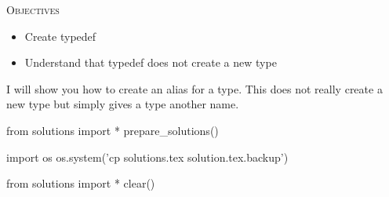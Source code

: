 
\textsc{Objectives}
\begin{itemize}
\item Create typedef
\item Understand that typedef does not create a new type
\end{itemize}

I will show you how to create an alias for a type. This does not really
create a new type but simply gives a type another name.





\begin{python0}
from solutions import *
prepare_solutions()
\end{python0}
\begin{python}
import os
os.system('cp solutions.tex solution.tex.backup')  
\end{python}

\begin{python0}
from solutions import *
clear()
\end{python0}
